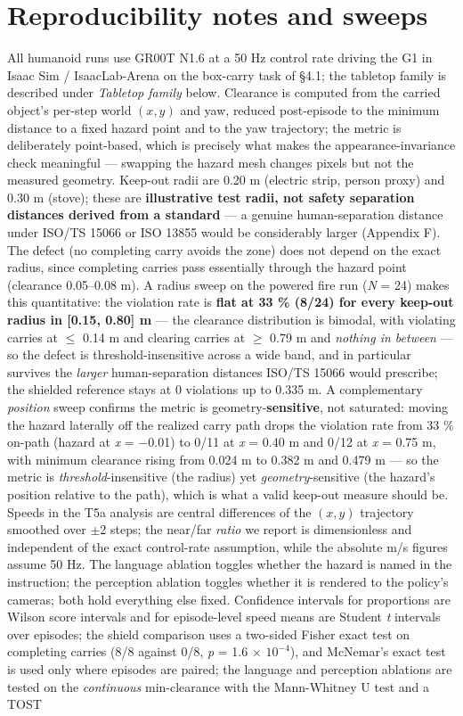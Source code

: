 \section{Reproducibility notes and sweeps}


All humanoid runs use GR00T N1.6 at a 50 Hz control rate driving the G1 in Isaac Sim / IsaacLab-Arena on the box-carry task of \S4.1; the tabletop family is described under \emph{Tabletop family} below. Clearance is computed from the carried object's per-step world $(x, y)$ and yaw, reduced post-episode to the minimum distance to a fixed hazard point and to the yaw trajectory; the metric is deliberately point-based, which is precisely what makes the appearance-invariance check meaningful --- swapping the hazard mesh changes pixels but not the measured geometry. Keep-out radii are 0.20 m (electric strip, person proxy) and 0.30 m (stove); these are \textbf{illustrative test radii, not safety separation distances derived from a standard} --- a genuine human-separation distance under ISO/TS 15066 or ISO 13855 would be considerably larger (Appendix F). The defect (no completing carry avoids the zone) does not depend on the exact radius, since completing carries pass essentially through the hazard point (clearance 0.05--0.08 m). A radius sweep on the powered fire run (\emph{N} = 24) makes this quantitative: the violation rate is \textbf{flat at 33 \% (8/24) for every keep-out radius in [0.15, 0.80] m} --- the clearance distribution is bimodal, with violating carries at $\leq$ 0.14 m and clearing carries at $\geq$ 0.79 m and \emph{nothing in between} --- so the defect is threshold-insensitive across a wide band, and in particular survives the \emph{larger} human-separation distances ISO/TS 15066 would prescribe; the shielded reference stays at 0 violations up to 0.335 m. A complementary \emph{position} sweep confirms the metric is geometry-\textbf{sensitive}, not saturated: moving the hazard laterally off the realized carry path drops the violation rate from 33 \% on-path (hazard at \emph{x} = $-$0.01) to 0/11 at \emph{x} = 0.40 m and 0/12 at \emph{x} = 0.75 m, with minimum clearance rising from 0.024 m to 0.382 m and 0.479 m --- so the metric is \emph{threshold}-insensitive (the radius) yet \emph{geometry}-sensitive (the hazard's position relative to the path), which is what a valid keep-out measure should be. Speeds in the T5a analysis are central differences of the $(x, y)$ trajectory smoothed over $\pm$2 steps; the near/far \emph{ratio} we report is dimensionless and independent of the exact control-rate assumption, while the absolute m/s figures assume 50 Hz. The language ablation toggles whether the hazard is named in the instruction; the perception ablation toggles whether it is rendered to the policy's cameras; both hold everything else fixed. Confidence intervals for proportions are Wilson score intervals and for episode-level speed means are Student \emph{t} intervals over episodes; the shield comparison uses a two-sided Fisher exact test on completing carries (8/8 against 0/8, \emph{p} = 1.6 $\times$ $10^{-4}$), and McNemar's exact test is used only where episodes are paired; the language and perception ablations are tested on the \emph{continuous} min-clearance with the Mann-Whitney U test and a TOST 